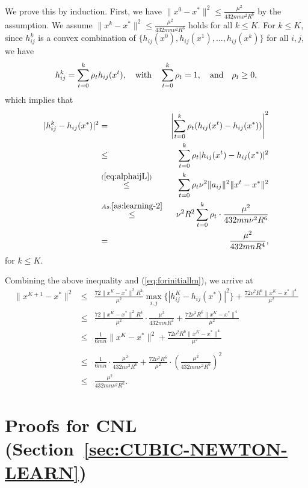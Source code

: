 \documentclass[12pt]{article}
\newcommand{\newalpha}{h}
\begin{document}
We prove this by induction. First, we have $\|x^0 - x^*\|^2 \leq \frac{\mu^2}{432mn \nu^2R^6}$ by the assumption. We assume $\|x^k - x^*\|^2 \leq \frac{\mu^2}{432mn \nu^2R^6}$ holds for all $k \leq K$. For $k\leq K$, since $h_{ij}^k$ is a convex combination of $\{  \newalpha_{ij}(x^0), \newalpha_{ij}(x^1), ..., \newalpha_{ij}(x^k)  \}$ for all $i,j$, we have 
$$
h_{ij}^k = \sum_{t=0}^k \rho_t \newalpha_{ij}(x^t), \quad {\rm with}\quad  \sum_{t=0}^k\rho_t = 1, \quad {\rm and} \quad \rho_t \geq 0, 
$$
which implies that 
\begin{eqnarray*}
	|h_{ij}^k - \newalpha_{ij}(x^*)|^2 &=&   \left|  \sum_{t=0}^k \rho_t (\newalpha_{ij}(x^t) - \newalpha_{ij}(x^*))  \right|^2 \\ 
	&\leq&   \sum_{t=0}^k \rho_t | \newalpha_{ij}(x^t) - \newalpha_{ij}(x^*) |^2 \\ 
	&\overset{(\ref{eq:alphaijL})}{\leq}&   \sum_{t=0}^k \rho_t \nu^2 \|a_{ij}\|^2 \|x^t - x^*\|^2 \\ 
	&\overset{As. \ref{as:learning-2}}{\leq}& \nu^2 R^2  \sum_{t=0}^k \rho_t \cdot \frac{\mu^2}{432mn \nu^2R^6} \\
	&=& \frac{ \mu^2}{432mnR^4}, 
\end{eqnarray*}
for $k\leq K$. 

\noindent Combining the above inequality and (\ref{eq:forinitiallm}), we arrive at 
\begin{eqnarray*}
	\|x^{K+1} - x^*\|^2 &\leq& \frac{72\|x^K-x^*\|^2 R^4}{\mu^2} \max_{i, j} \{  | h_{ij}^K - \newalpha_{ij}(x^*) |^2  \}  + \frac{ 72\nu^2 R^6\|x^K-x^*\|^4}{\mu^2} \\
	&\leq& \frac{72\|x^K-x^*\|^2 R^4}{\mu^2} \cdot  \frac{ \mu^2}{432mnR^4} +  \frac{ 72\nu^2 R^6\|x^K-x^*\|^4}{\mu^2} \\
	&\leq& \frac{1}{6mn}\|x^K - x^*\|^2 + \frac{ 72\nu^2 R^6\|x^K-x^*\|^4}{\mu^2} \\ \\
	&\leq& \frac{1}{6mn} \cdot \frac{\mu^2}{432n \nu^2R^6} + \frac{72 \nu^2 R^6}{\mu^2} \cdot \left(\frac{\mu^2}{432mn \nu^2R^6} \right)^2 \\ 
	&\leq& \frac{\mu^2}{432mn \nu^2R^6}. 
\end{eqnarray*}

\clearpage








\section{Proofs for {\sf CNL} (Section~\ref{sec:CUBIC-NEWTON-LEARN})}
\end{document}
